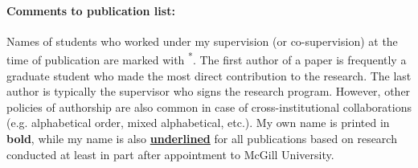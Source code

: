 \paragraph{Comments to publication list:} 
Names of students who worked under my supervision (or co-supervision) at the time of publication are marked with \textsuperscript{*}. The first author of a paper is frequently a graduate student who made the most direct contribution to the research. The last author is typically the supervisor who signs the research program. However, other policies of authorship are also common in case of cross-institutional collaborations (e.g. alphabetical order, mixed alphabetical, etc.). My own name is printed in \textbf{bold}, while my name is also \textbf{\underline{underlined}} for all 
publications based on research conducted at least in part after appointment to McGill University.




